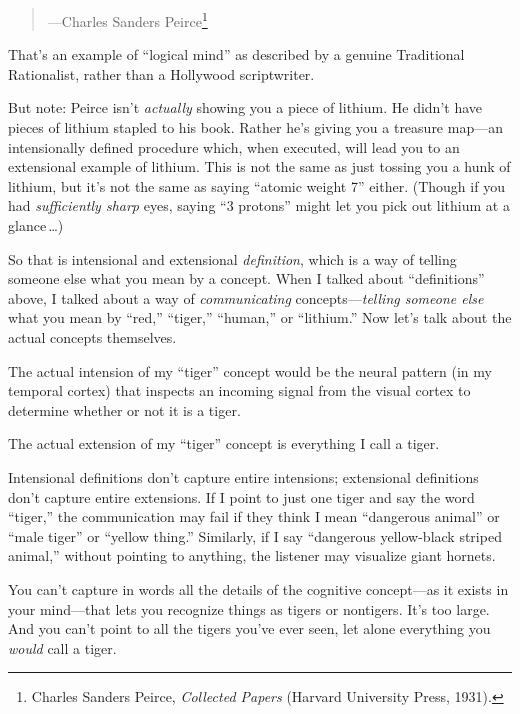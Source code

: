 {\begin{quote}
{\raggedleft
 {}---Charles Sanders Peirce\footnote{Charles Sanders Peirce, \textit{Collected Papers} (Harvard
University Press, 1931).}
\par}
\end{quote}



 That's an example of ``logical
mind'' as described by a genuine Traditional
Rationalist, rather than a Hollywood scriptwriter.


 But note: Peirce isn't \textit{actually} showing
you a piece of lithium. He didn't have pieces of
lithium stapled to his book. Rather he's giving you a
treasure map---an intensionally defined procedure which, when executed,
will lead you to an extensional example of lithium. This is not the
same as just tossing you a hunk of lithium, but it's
not the same as saying ``atomic weight
7'' either. (Though if you had \textit{sufficiently
sharp} eyes, saying ``3 protons''
might let you pick out lithium at a glance\,\ldots)


 So that is intensional and extensional \textit{definition}, which
is a way of telling someone else what you mean by a concept. When I
talked about ``definitions'' above,
I talked about a way of \textit{communicating}
concepts---\textit{telling someone else} what you mean by
``red,''
``tiger,''
``human,'' or
``lithium.'' Now
let's talk about the actual concepts themselves.


 The actual intension of my
``tiger'' concept would be the
neural pattern (in my temporal cortex) that inspects an incoming signal
from the visual cortex to determine whether or not it is a tiger.


 The actual extension of my
``tiger'' concept is everything I
call a tiger.


 Intensional definitions don't capture entire
intensions; extensional definitions don't capture
entire extensions. If I point to just one tiger and say the word
``tiger,'' the communication may
fail if they think I mean ``dangerous
animal'' or ``male
tiger'' or ``yellow
thing.'' Similarly, if I say
``dangerous yellow-black striped
animal,'' without pointing to anything, the listener
may visualize giant hornets.


 You can't capture in words all the details of the
cognitive concept---as it exists in your mind---that lets you recognize
things as tigers or nontigers. It's too large. And you
can't point to all the tigers you've
ever seen, let alone everything you \textit{would} call a tiger.


}
